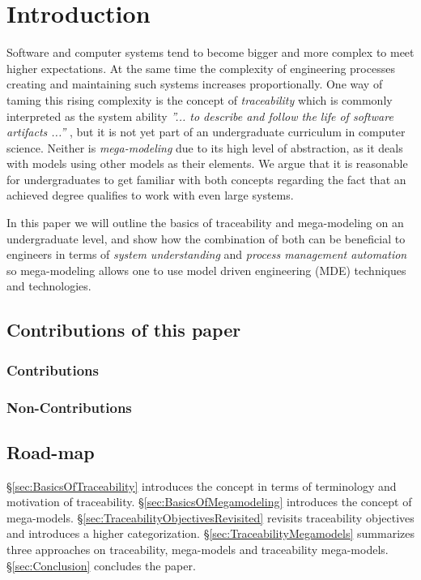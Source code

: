 \section{Introduction}\label{sec:Introduction}
Software and computer systems tend to become bigger and more complex to meet higher expectations.
At the same time the complexity of engineering processes creating and maintaining such systems increases proportionally.
One way of taming this rising complexity is the concept of \textit{traceability} which is commonly interpreted as the system ability \textit{''... to describe and follow the life of software artifacts ...''} \cite{ScopedTraceability}, but it is not yet part of an undergraduate curriculum in computer science. 
Neither is \textit{mega-modeling} due to its high level of abstraction, as it deals with models using other models as their elements. 
We argue that it is reasonable for undergraduates to get familiar with both concepts regarding the fact that an achieved degree qualifies to work with even large systems.

In this paper we will outline the basics of traceability and mega-modeling on an undergraduate level, and show how the combination of both can be beneficial to engineers in terms of \textit{system understanding} and \textit{process management automation} so mega-modeling allows one to use model driven engineering (MDE) techniques and technologies.

\subsection{Contributions of this paper}
\subsubsection{Contributions}
\subsubsection{Non-Contributions}

\subsection{Road-map}\label{subsec:Introduction.Road-map}
§\ref{sec:BasicsOfTraceability}
introduces the concept in terms of terminology and motivation of traceability.
§\ref{sec:BasicsOfMegamodeling}
introduces the concept of mega-models.
§\ref{sec:TraceabilityObjectivesRevisited}
revisits traceability objectives and introduces a higher categorization.
§\ref{sec:TraceabilityMegamodels}
summarizes three approaches on traceability, mega-models and traceability mega-models.
§\ref{sec:Conclusion}
concludes the paper.


